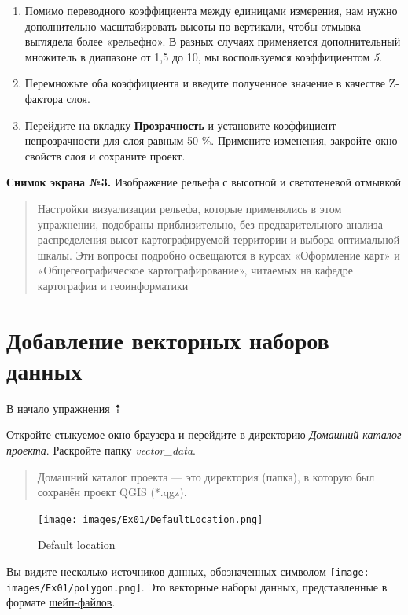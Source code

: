 \documentclass[
  12pt,
]{book}
\begin{document}
\begin{enumerate}
\def\labelenumi{\arabic{enumi}.}
\setcounter{enumi}{12}
\item
  Помимо переводного коэффициента между единицами измерения, нам нужно дополнительно масштабировать высоты по вертикали, чтобы отмывка выглядела более «рельефно». В разных случаях применяется дополнительный множитель в диапазоне от 1,5 до 10, мы воспользуемся коэффициентом \emph{5}.
\item
  Перемножьте оба коэффициента и введите полученное значение в качестве Z-фактора слоя.
\item
  Перейдите на вкладку \textbf{Прозрачность} и установите коэффициент непрозрачности для слоя равным 50 \%. Примените изменения, закройте окно свойств слоя и сохраните проект.
\end{enumerate}

\textbf{Снимок экрана №3.} Изображение рельефа с высотной и светотеневой отмывкой

\begin{quote}
Настройки визуализации рельефа, которые применялись в этом упражнении, подобраны приблизительно, без предварительного анализа распределения высот картографируемой территории и выбора оптимальной шкалы. Эти вопросы подробно освещаются в курсах «Оформление карт» и «Общегеографическое картографирование», читаемых на кафедре картографии и геоинформатики
\end{quote}

\hypertarget{map-design-general-vector}{%
\section{Добавление векторных наборов данных}\label{map-design-general-vector}}

\protect\hyperlink{map-design-general}{В начало упражнения ⇡}

Откройте стыкуемое окно браузера и перейдите в директорию \emph{Домашний каталог проекта}. Раскройте папку \emph{vector\_data}.

\begin{quote}
Домашний каталог проекта --- это директория (папка), в которую был сохранён проект QGIS (*.qgz).
\end{quote}

\begin{figure}
\centering
\texttt{[image: images/Ex01/DefaultLocation.png]}
\caption{Default location}
\end{figure}

Вы видите несколько источников данных, обозначенных символом \texttt{[image: images/Ex01/polygon.png]}. Это векторные наборы данных, представленные в формате \href{https://desktop.arcgis.com/ru/arcmap/latest/manage-data/shapefiles/what-is-a-shapefile.htm}{шейп-файлов}.
\end{document}
